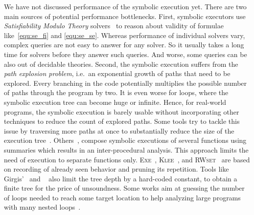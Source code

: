 We have not discussed performance of the symbolic execution yet. There are
two main sources of potential performance bottlenecks. First, symbolic
executors use \emph{Satisfiability Modulo Theory} solvers~\cite{smt} to reason
about validity of formulae like~\ref{equ:se_fi} and \ref{equ:se_se}.  Whereas
performance of individual solvers vary, complex queries are not easy to answer
for any solver. So it usually takes a long time for solvers before they
answer such queries. And worse, some queries can be also out of decidable
theories.  Second, the symbolic execution suffers from the \emph{path
explosion problem}, i.e.\ an exponential growth of paths that need to be
explored. Every branching in the code potentially multiplies the possible
number of paths through the program by two. It is even worse for loops, where
the symbolic execution tree can become huge or infinite.  Hence, for
real-world programs, the symbolic execution is barely usable without
incorporating other techniques to reduce the count of explored paths.  Some
tools try to tackle this issue by traversing more paths at once to
substantially reduce the size of the execution tree~\cite{cse_atva}.
Others~\cite{pex_ddse, G07}, compose symbolic executions of several functions
using summaries which results in an inter-procedural analysis. This approach
limits the need of execution to separate functions only.
\textsc{Exe}~\cite{exe}, \textsc{Klee}~\cite{klee}, and
\textsc{RWset}~\cite{rwset} are based on recording of already seen behavior
and pruning its repetition. Tools like Girgis'~\cite{se_limited} and
\ucklee~\cite{ucklee} also limit the tree depth by a hard-coded constant, to
obtain a finite tree for the price of unsoundness.  Some works aim at guessing
the number of loops needed to reach some target location to help analyzing
large programs with many nested loops~\cite{partial_loop}.

